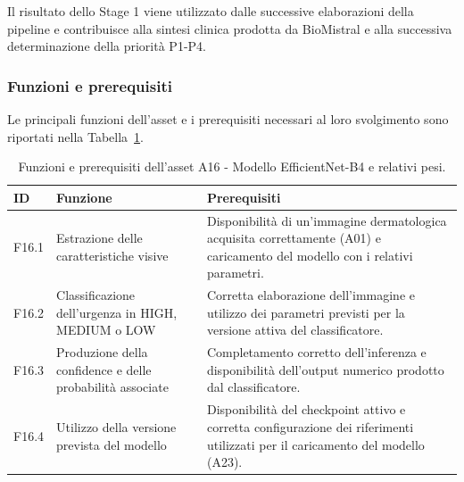 Il risultato dello Stage 1 viene utilizzato dalle successive elaborazioni
della pipeline e contribuisce alla sintesi clinica prodotta da BioMistral
e alla successiva determinazione della priorità P1-P4.


\subsubsection{Funzioni e prerequisiti}
Le principali funzioni dell'asset e i prerequisiti necessari al loro svolgimento sono riportati nella Tabella~\ref{tab:a16-functions}.

\begin{table}[H]
    \centering
    \small
    \setlength{\tabcolsep}{4pt}
    \renewcommand{\arraystretch}{1.08}

    \begin{tabularx}{\textwidth}{
        >{\raggedright\arraybackslash}p{1.1cm}
        >{\raggedright\arraybackslash}p{3.8cm}
        X
    }
        \toprule

        \textbf{ID} &
        \textbf{Funzione} &
        \textbf{Prerequisiti} \\

        \midrule

        F16.1 &
        Estrazione delle caratteristiche visive &
        Disponibilità di un'immagine dermatologica acquisita correttamente
        (A01) e caricamento del modello con i relativi parametri. \\

        \midrule

        F16.2 &
        Classificazione dell'urgenza in HIGH, MEDIUM o LOW &
        Corretta elaborazione dell'immagine e utilizzo dei parametri
        previsti per la versione attiva del classificatore. \\

        \midrule

        F16.3 &
        Produzione della confidence e delle probabilità associate &
        Completamento corretto dell'inferenza e disponibilità dell'output
        numerico prodotto dal classificatore. \\

        \midrule

        F16.4 &
        Utilizzo della versione prevista del modello &
        Disponibilità del checkpoint attivo e corretta configurazione
        dei riferimenti utilizzati per il caricamento del modello (A23). \\

        \bottomrule
    \end{tabularx}

    \caption{Funzioni e prerequisiti dell'asset A16 - Modello EfficientNet-B4 e relativi pesi.}
    \label{tab:a16-functions}
\end{table}



